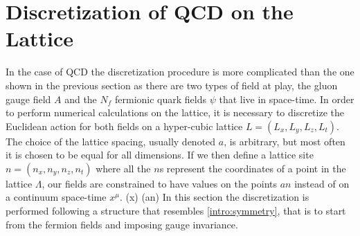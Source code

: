\section{Discretization of QCD on the Lattice}
\label{sec:lattice_discretize}
In the case of QCD the discretization procedure is more complicated than the one shown in the previous section as there are two types of field at play, the gluon gauge field $A$ and the $N_f$ fermionic quark fields $\psi$ that live in space-time. In order to perform numerical calculations on the lattice, it is necessary to discretize the Euclidean action for both fields on a hyper-cubic lattice $L = (L_x, L_y, L_z, L_t)$. The choice of the lattice spacing, usually denoted $a$, is arbitrary, but most often it is chosen to be equal for all dimensions. If we then define a lattice site $n = (n_x, n_y, n_z, n_t)$ where all the $n$s represent the coordinates of a point in the lattice $\Lambda$, our fields are constrained to have values on the points $an$ instead of on a continuum space-time $x^\mu$.
\beq
    \phi(x)  \phi(an)
\eeq
In this section the discretization is performed following a structure that resembles \cref{intro:symmetry}, that is to start from the fermion fields and imposing gauge invariance.


